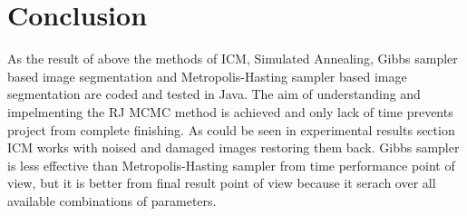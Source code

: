 \documentclass[journal]{IEEEtran}
\begin{document}
%


\section{Conclusion}
As the result of above the methods of ICM, Simulated Annealing, Gibbs sampler based image segmentation and Metropolis-Hasting sampler based image segmentation are coded and tested in Java. The aim of understanding and impelmenting the RJ MCMC method is achieved and only lack of time prevents project from complete finishing. As could be seen in experimental results section ICM works with noised and damaged images restoring them back. Gibbs sampler is less effective than Metropolis-Hasting sampler from time performance point of view, but it is better from final result point of view because it serach over all available combinations of parameters.


%
%
\appendix
\end{document}
